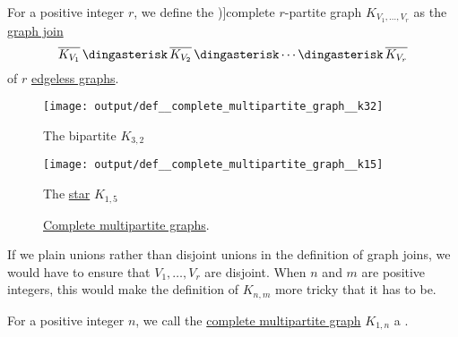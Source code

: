 \begin{definition}\label{def:complete_multipartite_graph}
  For a positive integer \( r \), we define the \term[ru=полный \( r \)-дольный (граф) (\cite[\S 1]{ЕмеличевИПр1990ТеорияГрафов})]{complete \( r \)-partite} graph \( K_{V_1,\ldots,V_r} \) as the \hyperref[def:graph_join]{graph join}
  \begin{equation*}
    \oline{K_{V_1}} \Ast \oline{K_{V_2}} \Ast \cdots \Ast \oline{K_{V_r}}
  \end{equation*}
  of \( r \) \hyperref[def:edgeless_graph]{edgeless graphs}.

  \begin{figure}[!ht]
    \begin{subcaptionblock}{0.45\textwidth}
      \centering
      \texttt{[image: output/def\_\_complete\_multipartite\_graph\_\_k32]}
      \caption{The bipartite \( K_{3,2} \)}\label{fig:def:complete_multipartite_graph/k32}
    \end{subcaptionblock}
    \hfill
    \begin{subcaptionblock}{0.45\textwidth}
      \centering
      \texttt{[image: output/def\_\_complete\_multipartite\_graph\_\_k15]}
      \caption{The \hyperref[def:star_graph]{star} \( K_{1,5} \)}\label{fig:def:complete_multipartite_graph/k15}
    \end{subcaptionblock}
    \caption{\hyperref[def:complete_multipartite_graph]{Complete multipartite graphs}.}\label{fig:def:complete_multipartite_graph}
  \end{figure}
\end{definition}
\begin{comments}
  \item If we plain unions rather than disjoint unions in the definition of graph joins, we would have to ensure that \( V_1, \ldots, V_r \) are disjoint. When \( n \) and \( m \) are positive integers, this would make the definition of \( K_{n,m} \) more tricky that it has to be.
\end{comments}

\begin{definition}\label{def:star_graph}
  For a positive integer \( n \), we call the \hyperref[def:complete_multipartite_graph]{complete multipartite graph} \( K_{1,n} \) a .
\end{definition}

